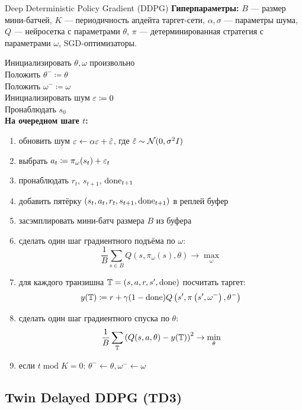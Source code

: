 \begin{algorithm}[label = DDPGalgorithm]{Deep Deterministic Policy Gradient (DDPG)}
\textbf{Гиперпараметры:} $B$ --- размер мини-батчей, $K$ --- периодичность апдейта таргет-сети, $\alpha, \sigma$ --- параметры шума, $Q$ --- нейросетка с параметрами $\theta$, $\pi$ --- детерминированная стратегия с параметрами $\omega$, SGD-оптимизаторы.

\vspace{0.3cm}
Инициализировать $\theta, \omega$ произвольно \\
Положить $\theta^- \coloneqq \theta$ \\
Положить $\omega^- \coloneqq \omega$ \\
Инициализировать шум $\varepsilon \coloneqq 0$ \\
Пронаблюдать $s_0$ \\
\textbf{На очередном шаге $t$:}
\begin{enumerate}
    \item обновить шум $\varepsilon \leftarrow \alpha \varepsilon + \hat{\varepsilon}$, где $\hat{\varepsilon} \sim \mathcal{N}(0, \sigma^2 I)$
    \item выбрать $a_t \coloneqq \pi_\omega(s_t) + \varepsilon_{t}$
    \item пронаблюдать $r_t$,  $s_{t+1}$, $\mathrm{done}_{t+1}$
    \item добавить пятёрку $(s_t, a_t, r_t, s_{t+1}, \mathrm{done}_{t+1})$ в реплей буфер
    \item засэмплировать мини-батч размера $B$ из буфера
    \item сделать один шаг градиентного подъёма по $\omega$:
    $$\frac{1}{B}\sum_{s \in B} Q(s, \pi_\omega(s), \theta) \to \max_{\omega}$$
    \item для каждого транзишна $\mathbb{T} = (s, a, r, s', \mathrm{done})$ посчитать таргет:
    $$y(\mathbb{T} ) \coloneqq r + \gamma (1 - \mathrm{done}) Q\left( s', \pi \left( s', \omega^{-}\right), \theta^{-} \right)$$
    \item сделать один шаг градиентного спуска по $\theta$:
    $$\frac{1}{B}\sum_{\mathbb{T}} \left( Q(s, a, \theta) - y(\mathbb{T} ) \right) ^2 \to \min_\theta$$
    \item если $t \operatorname{mod} K = 0$: $\theta^- \gets \theta, \omega^- \gets \omega$
\end{enumerate}
\end{algorithm}

\subsection{Twin Delayed DDPG (TD3)}

